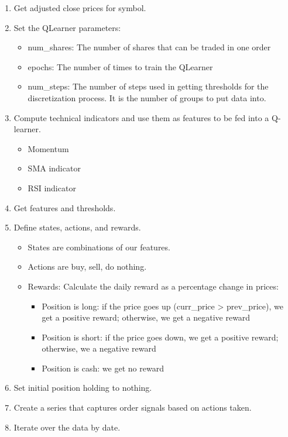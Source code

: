 \documentclass[11pt]{article}
\providecommand{\tightlist}{%
      \setlength{\itemsep}{0pt}\setlength{\parskip}{0pt}}
\begin{document}
\begin{enumerate}
\def\labelenumi{\arabic{enumi}.}
\tightlist
\item
  Get adjusted close prices for symbol.
\item
  Set the QLearner parameters:

  \begin{itemize}
  \tightlist
  \item
    num\_shares: The number of shares that can be traded in one order
  \item
    epochs: The number of times to train the QLearner
  \item
    num\_steps: The number of steps used in getting thresholds for the
    discretization process. It is the number of groups to put data into.
  \end{itemize}
\item
  Compute technical indicators and use them as features to be fed into a
  Q-learner.

  \begin{itemize}
  \tightlist
  \item
    Momentum
  \item
    SMA indicator
  \item
    RSI indicator
  \end{itemize}
\item
  Get features and thresholds.
\item
  Define states, actions, and rewards.

  \begin{itemize}
  \tightlist
  \item
    States are combinations of our features.
  \item
    Actions are buy, sell, do nothing.
  \item
    Rewards: Calculate the daily reward as a percentage change in
    prices:

    \begin{itemize}
    \tightlist
    \item
      Position is long: if the price goes up (curr\_price \textgreater{}
      prev\_price), we get a positive reward; otherwise, we get a
      negative reward
    \item
      Position is short: if the price goes down, we get a positive
      reward; otherwise, we a negative reward
    \item
      Position is cash: we get no reward
    \end{itemize}
  \end{itemize}
\item
  Set initial position holding to nothing.
\item
  Create a series that captures order signals based on actions taken.
\item
  Iterate over the data by date.


\end{enumerate}
\end{document}
